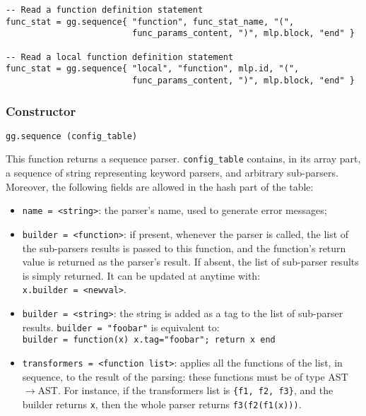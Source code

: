 \begin{verbatim}
-- Read a function definition statement
func_stat = gg.sequence{ "function", func_stat_name, "(",
                         func_params_content, ")", mlp.block, "end" }

-- Read a local function definition statement
func_stat = gg.sequence{ "local", "function", mlp.id, "(",
                         func_params_content, ")", mlp.block, "end" }

\end{verbatim}

\subsubsection{Constructor}

\begin{verbatim}
gg.sequence (config_table)  
\end{verbatim}

This function returns a sequence parser. \verb|config_table| contains,
in its array part, a sequence of string representing keyword parsers,
and arbitrary sub-parsers. Moreover, the following fields are allowed
in the hash part of the table:

\begin{itemize}
\item\verb|name = <string>|: the parser's name, used to generate error
  messages;
\item\verb|builder = <function>|: if present, whenever the parser is
  called, the list of the sub-parsers results is passed to this
  function, and the function's return value is returned as the
  parser's result. If absent, the list of sub-parser results is simply
  returned. It can be updated at anytime with:\\
  \verb|x.builder = <newval>|.
\item\verb|builder = <string>|: the string is added as a tag to the
  list of sub-parser results. \verb|builder = "foobar"| is equivalent
  to:\\
 \verb|builder = function(x) x.tag="foobar"; return x end|
\item\verb|transformers = <function list>|: applies all the functions
  of the list, in sequence, to the result of the parsing: these
  functions must be of type AST$\rightarrow$AST. For instance, if the
  transformers list is {\tt\{f1, f2, f3\}}, and the builder returns
  {\tt x}, then the whole parser returns {\tt f3(f2(f1(x)))}.
\end{itemize}

